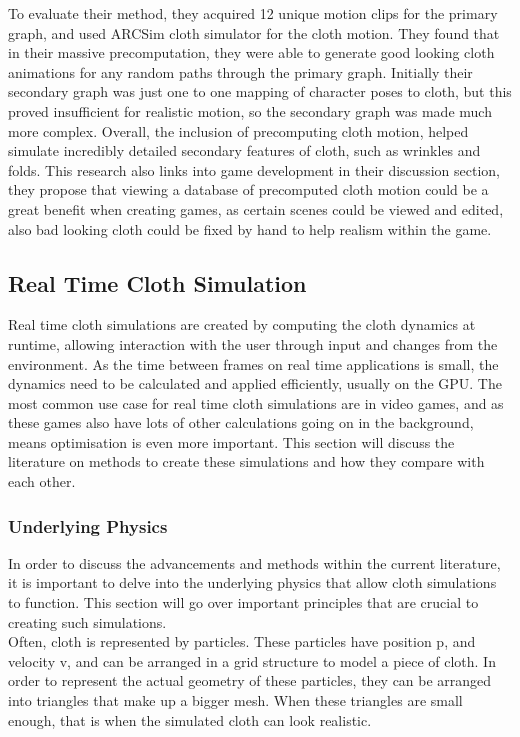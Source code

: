 \documentclass[12pt,a4paper]{article}
\begin{document}
To evaluate their method, they acquired 12 unique motion clips for the primary graph, and used ARCSim cloth simulator for the cloth motion. They found that in their massive precomputation, they were able to generate good looking cloth animations for any random paths through the primary graph. Initially their secondary graph was just one to one mapping of character poses to cloth, but this proved insufficient for realistic motion, so the secondary graph was made much more complex. 
Overall, the inclusion of precomputing cloth motion, helped simulate incredibly detailed secondary features of cloth, such as wrinkles and folds. This research also links into game development in their discussion section, they propose that viewing a database of precomputed cloth motion could be a great benefit when creating games, as certain scenes could be viewed and edited, also bad looking cloth could be fixed by hand to help realism within the game.


\subsection{Real Time Cloth Simulation}
Real time cloth simulations are created by computing the cloth dynamics at runtime, allowing interaction with the user through input and changes from the environment. As the time between frames on real time applications is small, the dynamics need to be calculated and applied efficiently, usually on the GPU. The most common use case for real time cloth simulations are in video games, and as these games also have lots of other calculations going on in the background, means optimisation is even more important. This section will discuss the literature on methods to create these simulations and how they compare with each other. \\
 
\subsubsection{Underlying Physics}
In order to discuss the advancements and methods within the current literature, it is important to delve into the underlying physics that allow cloth simulations to function. This section will go over important principles that are crucial to creating such simulations.
\\

Often, cloth is represented by particles. These particles have position p, and velocity v, and can be arranged in a grid structure to model a piece of cloth. In order to represent the actual geometry of these particles, they can be arranged into triangles that make up a bigger mesh. When these triangles are small enough, that is when the simulated cloth can look realistic.
\\
\end{document}

